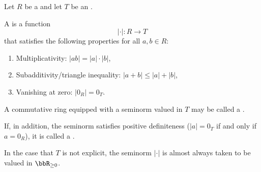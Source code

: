 \begin{definition} \label{definition:seminorm_on_a_commutative_ring_valued_in_an_ordered_semiring}
Let $R$ be a  and let $T$ be an .

A  is a function
$$
| \cdot | : R \to T
$$
that satisfies the following properties for all $a, b \in R$:
\begin{enumerate}
    \item Multiplicativity: $|ab| = |a| \cdot |b|$,
    \item Subadditivity/triangle inequality: $|a + b| \leq |a| + |b|$,
    \item Vanishing at zero: $|0_R| = 0_T$.
\end{enumerate}
A commutative ring equipped with a seminorm valued in $T$ may be called a .

If, in addition, the seminorm satisfies positive definiteness ($|a| = 0_T$ if and only if $a = 0_R$), it is called a .

In the case that $T$ is not explicit, the seminorm $|\cdot|$ is almost always taken to be valued in $\bbR_{\geq 0}$.
\end{definition}
